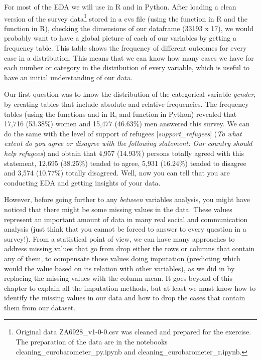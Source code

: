 For most of the EDA we will use  in R and  in Python. After loading a clean version of the survey data\footnote{Original data ZA6928\_v1-0-0.csv was cleaned and prepared for the exercise. The preparation of the data are in the notebooks cleaning\_eurobarometer\_py.ipynb and cleaning\_eurobarometer\_r.ipynb.}  stored in a cvs file (using the  function  in R and the  function  in R), checking the dimensions of our dataframe (33193 x 17), we would probably want to have a global picture of each of our variables by getting a frequency table. This table shows the frequency of different outcomes for every case in a distribution. This means that we can know how many cases we have for each number or category in the distribution of every variable, which is useful to have an initial understanding of our data.

		
Our first question was to know the distribution of the categorical variable \textit{gender}, by creating tables that include absolute and relative frequencies. The frequency tables (using the  functions  and  in R, and  function  in Python) revealed that 17,716 (53.38\%) women and 15,477 (46.63\%) men answered this survey. We can do the same with the level of support of refugees [\textit{support\_refugees}] (\textit{To what extent do you agree or disagree with the following statement: Our country should help refugees}) and obtain that 4,957 (14.93\%) persons totally agreed with this statement, 12,695 (38.25\%) tended to agree, 5,931 (16.24\%) tended to disagree and 3,574 (10.77\%) totally disagreed. Well, now you can tell that you are conducting EDA and getting insights of your data.



However, before going further to any \textit{between} variables analysis, you might have noticed that there might be some missing values in the data. These values represent an important amount of data in many real social and communication analysis (just think that you cannot be forced to answer to every question in a survey!). From a statistical point of view, we can have many approaches to address missing values that go from drop either the rows or columns that contain any of them, to compensate those values doing imputation (predicting which would the value based on its relation with other variables), as we did in  by replacing the missing values with the column mean. It goes beyond of this chapter to explain all the imputation methods, but at least we must know how to identify the missing values in our data and how to drop the cases that contain them from our dataset.

